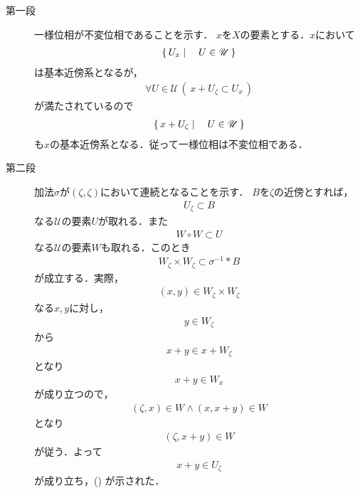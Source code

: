	\begin{sketch}\mbox{}
		\begin{description}
			\item[第一段] 一様位相が不変位相であることを示す．
				$x$を$X$の要素とする．$x$において
				\begin{align}
					\left\{\, U_x \mid \quad U \in \mathscr{U}\, \right\}
				\end{align}
				は基本近傍系となるが，
				\begin{align}
					\forall U \in \mathscr{U}\, \left(\, x + U_\zeta \subset U_x\, \right)
				\end{align}
				が満たされているので
				\begin{align}
					\left\{\, x + U_\zeta \mid \quad U \in \mathscr{U}\, \right\}
				\end{align}
				も$x$の基本近傍系となる．従って一様位相は不変位相である．
				
			\item[第二段]
				加法$\sigma$が$(\zeta,\zeta)$において連続となることを示す．
				$B$を$\zeta$の近傍とすれば，
				\begin{align}
					U_\zeta \subset B
				\end{align}
				なる$\mathscr{U}$の要素$U$が取れる．また
				\begin{align}
					W \circ W \subset U
				\end{align}
				なる$\mathscr{U}$の要素$W$も取れる．このとき
				\begin{align}
					W_\zeta \times W_\zeta \subset \sigma^{-1} \ast B
				\end{align}
				が成立する．実際，
				\begin{align}
					(x,y) \in W_\zeta \times W_\zeta
					\label{eq:thm_entourages_introducing_vector_topology}
				\end{align}
				なる$x,y$に対し，
				\begin{align}
					y \in W_\zeta
				\end{align}
				から
				\begin{align}
					x + y \in x + W_\zeta
				\end{align}
				となり
				\begin{align}
					x + y \in W_x
				\end{align}
				が成り立つので，
				\begin{align}
					(\zeta,x) \in W \wedge (x,x+y) \in W
				\end{align}
				となり
				\begin{align}
					(\zeta,x+y) \in W
				\end{align}
				が従う．よって
				\begin{align}
					x+y \in U_\zeta
				\end{align}
				が成り立ち，()
				が示された．
				

\end{description}
\end{sketch}
